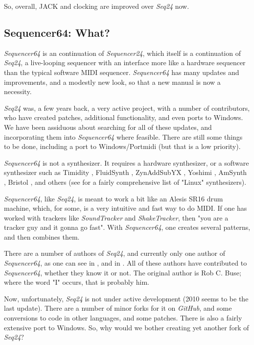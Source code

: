 \documentclass[
 11pt,
 twoside,
 a4paper,
 headinclude,
 footinclude,
 final                                 %
]{article}
\begin{document}
   So, overall, JACK and clocking are improved over \textsl{Seq24} now.

\subsection{Sequencer64: What?}
\label{subsec:what_is_sequencer64}

   \textsl{Sequencer64} is an continuation of \textsl{Sequencer24}, 
   which itself is a continuation of \textsl{Seq24},
   a live-looping sequencer with an interface more like a hardware sequencer
   than the typical software MIDI sequencer.
   \textsl{Sequencer64} has many updates and improvements, and a modestly
   new look, so that a new manual is now a necessity.

   \textsl{Seq24} was, a few years back, a very active project, with a
   number of contributors, who have created patches, additional
   functionality, and even ports to Windows.
   We have been assiduous about searching for all of these updates, and
   incorporating them into \textsl{Sequencer64} where feasible.
   There are still some things to be done, including a port to
   Windows/Portmidi (but that is a low priority).

   \textsl{Sequencer64} is not a synthesizer.  It requires a hardware
   synthesizer, or a software synthesizer such as Timidity \cite{timidity},
   FluidSynth \cite{fluidsynth}, ZynAddSubYX \cite{zynaddsubfx}, Yoshimi
   \cite{yoshimi} \cite{yoshimi2}, AmSynth \cite{amsynth}, Bristol
   \cite{bristol}, and others (see \cite{linuxsynths} for a fairly
   comprehensive list of "Linux" synthesizers).

   \textsl{Sequencer64}, like \textsl{Seq24},
   is meant to work a bit like an Alesis SR16 drum machine,
   which, for some, is a very intuitive and fast way to do MIDI.
   If one has worked with trackers like \textsl{SoundTracker} and
   \textsl{ShakeTracker}, then "you are a tracker guy and it gonna go fast".
   With \textsl{Sequencer64}, one creates several patterns, and then
   combines them.

   There are a number of authors of \textsl{Seq24}, and currently only
   one author of \textsl{Sequencer64},
   as one can see in ,
   and in .
   All of these authors have contributed to \textsl{Sequencer64}, whether
   they know it or not.
   The original author is Rob C. Buse; where the word "I" occurs, that is
   probably him.

   Now, unfortunately, \textsl{Seq24} is not under active
   development (2010 seems to be the last update).  There are a number of
   minor forks for it on \textsl{GitHub}, and some conversions
   to code in other languages, and some patches.
   There is also a fairly extensive port to Windows.
   So, why would we bother creating yet another fork of \textsl{Seq24}?
\end{document}

